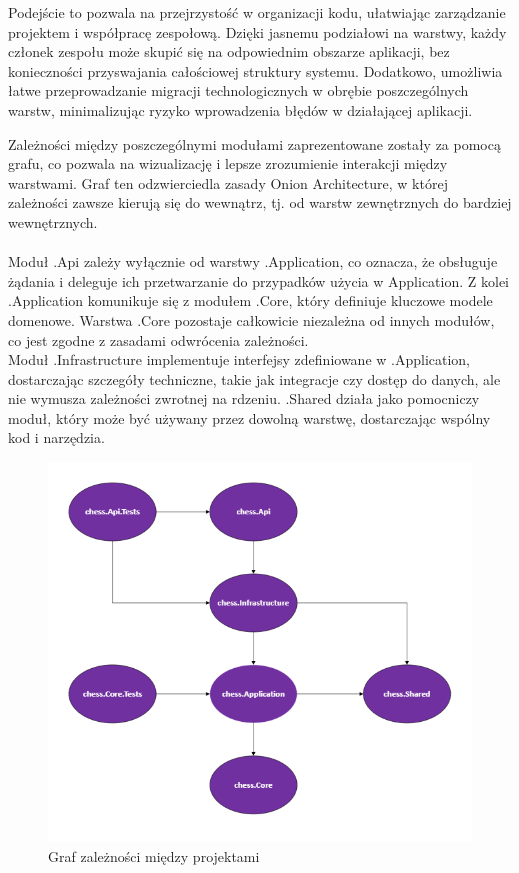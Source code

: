 \documentclass[12pt,a4paper]{article}
\begin{document}
Podejście to pozwala na przejrzystość w organizacji kodu, ułatwiając zarządzanie projektem i współpracę zespołową. Dzięki jasnemu podziałowi na warstwy, każdy członek zespołu może skupić się na odpowiednim obszarze aplikacji, bez konieczności przyswajania całościowej struktury systemu. Dodatkowo, umożliwia łatwe przeprowadzanie migracji technologicznych w obrębie poszczególnych warstw, minimalizując ryzyko wprowadzenia błędów w działającej aplikacji.

\newpage

Zależności między poszczególnymi modułami zaprezentowane zostały za pomocą grafu, co pozwala na wizualizację i lepsze zrozumienie interakcji między warstwami. Graf ten odzwierciedla zasady Onion Architecture, w której zależności zawsze kierują się do wewnątrz, tj. od warstw zewnętrznych do bardziej wewnętrznych.
\\\\
Moduł .Api zależy wyłącznie od warstwy .Application, co oznacza, że obsługuje żądania i deleguje ich przetwarzanie do przypadków użycia w Application. Z kolei .Application komunikuje się z modułem .Core, który definiuje kluczowe modele domenowe. Warstwa .Core pozostaje całkowicie niezależna od innych modułów, co jest zgodne z zasadami odwrócenia zależności.
\\
Moduł .Infrastructure implementuje interfejsy zdefiniowane w .Application, dostarczając szczegóły techniczne, takie jak integracje czy dostęp do danych, ale nie wymusza zależności zwrotnej na rdzeniu. .Shared działa jako pomocniczy moduł, który może być używany przez dowolną warstwę, dostarczając wspólny kod i narzędzia.

\begin{figure}[h!]
    \centering
    \includegraphics[width=1\textwidth]{zdj/backend_dependencies.png}
    \caption{Graf zależności między projektami}
\end{figure}
\end{document}
